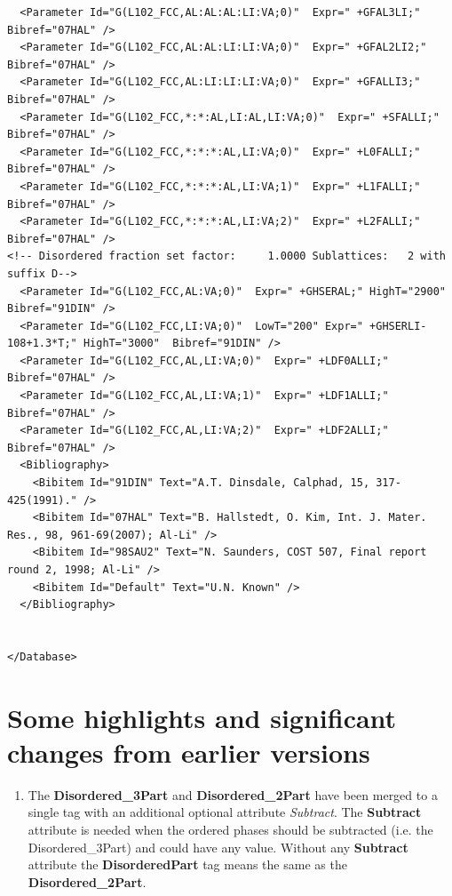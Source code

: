 \documentclass{article}
\begin{document}
\begin{appendices}
\begin{verbatim}
  <Parameter Id="G(L102_FCC,AL:AL:AL:LI:VA;0)"  Expr=" +GFAL3LI;"  Bibref="07HAL" />
  <Parameter Id="G(L102_FCC,AL:AL:LI:LI:VA;0)"  Expr=" +GFAL2LI2;"  Bibref="07HAL" />
  <Parameter Id="G(L102_FCC,AL:LI:LI:LI:VA;0)"  Expr=" +GFALLI3;"  Bibref="07HAL" />
  <Parameter Id="G(L102_FCC,*:*:AL,LI:AL,LI:VA;0)"  Expr=" +SFALLI;"  Bibref="07HAL" />
  <Parameter Id="G(L102_FCC,*:*:*:AL,LI:VA;0)"  Expr=" +L0FALLI;"  Bibref="07HAL" />
  <Parameter Id="G(L102_FCC,*:*:*:AL,LI:VA;1)"  Expr=" +L1FALLI;"  Bibref="07HAL" />
  <Parameter Id="G(L102_FCC,*:*:*:AL,LI:VA;2)"  Expr=" +L2FALLI;"  Bibref="07HAL" />
<!-- Disordered fraction set factor:     1.0000 Sublattices:   2 with suffix D-->
  <Parameter Id="G(L102_FCC,AL:VA;0)"  Expr=" +GHSERAL;" HighT="2900"  Bibref="91DIN" />
  <Parameter Id="G(L102_FCC,LI:VA;0)"  LowT="200" Expr=" +GHSERLI-108+1.3*T;" HighT="3000"  Bibref="91DIN" />
  <Parameter Id="G(L102_FCC,AL,LI:VA;0)"  Expr=" +LDF0ALLI;"  Bibref="07HAL" />
  <Parameter Id="G(L102_FCC,AL,LI:VA;1)"  Expr=" +LDF1ALLI;"  Bibref="07HAL" />
  <Parameter Id="G(L102_FCC,AL,LI:VA;2)"  Expr=" +LDF2ALLI;"  Bibref="07HAL" />
  <Bibliography>
    <Bibitem Id="91DIN" Text="A.T. Dinsdale, Calphad, 15, 317-425(1991)." /> 
    <Bibitem Id="07HAL" Text="B. Hallstedt, O. Kim, Int. J. Mater. Res., 98, 961-69(2007); Al-Li" /> 
    <Bibitem Id="98SAU2" Text="N. Saunders, COST 507, Final report round 2, 1998; Al-Li" /> 
    <Bibitem Id="Default" Text="U.N. Known" /> 
  </Bibliography>


</Database>
\end{verbatim}

\newpage

\setcounter{equation}{0}
\renewcommand{\theequation}{E\arabic{equation}}
\setcounter{figure}{0}
\renewcommand{\thefigure}{E\arabic{figure}}

\section{Some highlights and significant changes from earlier versions}\label{sec:changes}

\begin{enumerate}
\item The {\bf Disordered\_3Part} and {\bf Disordered\_2Part} have
  been merged to a single tag with an additional optional attribute
  {\em Subtract}.  The {\bf Subtract} attribute is needed when the
  ordered phases should be subtracted (i.e. the Disordered\_3Part) and
  could have any value.  Without any {\bf Subtract} attribute the {\bf
    DisorderedPart} tag means the same as the {\bf Disordered\_2Part}.


\end{enumerate}
\end{appendices}
\end{document}
